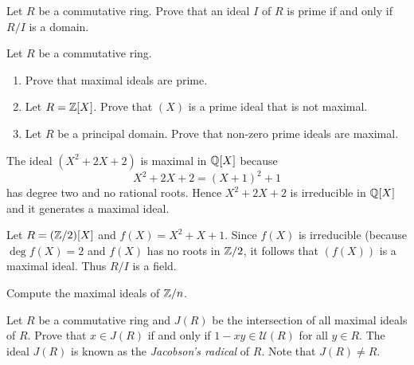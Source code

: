 \begin{exercise}
\label{xca:prime<=>domain}
    Let $R$ be a commutative ring. 
    Prove that an ideal $I$ of $R$ is prime if and only if $R/I$ is a domain. 
\end{exercise}

\begin{exercise}
Let $R$ be a commutative ring. 
\label{xca:maximal=>prime}
\begin{enumerate}
    \item Prove that maximal ideals are prime. 
    \item Let $R=\mathbb{Z}[X]$. Prove that $(X)$ is a prime ideal that is not maximal.
    \item Let $R$ be a principal domain. Prove that non-zero 
    prime ideals are maximal. 
\end{enumerate}
\end{exercise}

\begin{example}
	The ideal $(X^2+2X+2)$ is maximal in $\mathbb{Q}[X]$ because
	\[
	X^2+2X+2=(X+1)^2+1
	\]
	has degree two and no rational roots. 
	Hence $X^2+2X+2$ is irreducible in $\mathbb{Q}[X]$ and it generates 
	a maximal ideal. 	
\end{example}


\begin{example}
	Let $R=(\mathbb{Z}/2)[X]$ and $f(X)=X^2+X+1$. Since $f(X)$ is irreducible (because $\deg f(X)=2$ and
	$f(X)$ has no roots in $\mathbb{Z}/2$, it follows that $(f(X))$ is a maximal ideal. 
	Thus $R/I$ is a field. 
\end{example}

\begin{exercise}
	Compute the maximal ideals of $\mathbb{Z}/n$. 	
\end{exercise}

\begin{exercise}
\label{xca:Jacobson}
	Let $R$ be a commutative ring and $J(R)$ be the intersection of all maximal ideals 
	of $R$. Prove that $x\in J(R)$ 
	if and only if $1-xy\in\mathcal{U}(R)$ for all $y\in R$. The ideal $J(R)$ is known
	as the \emph{Jacobson's radical} of $R$. Note that $J(R)\ne R$.   
\end{exercise}

